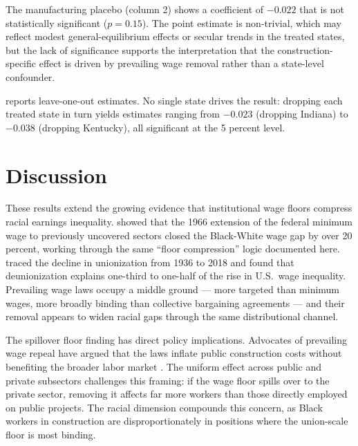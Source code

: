 \documentclass[12pt]{article}
\begin{document}
The manufacturing placebo (column 2) shows a coefficient of $-0.022$ that is not statistically significant ($p = 0.15$). The point estimate is non-trivial, which may reflect modest general-equilibrium effects or secular trends in the treated states, but the lack of significance supports the interpretation that the construction-specific effect is driven by prevailing wage removal rather than a state-level confounder.

 reports leave-one-out estimates. No single state drives the result: dropping each treated state in turn yields estimates ranging from $-0.023$ (dropping Indiana) to $-0.038$ (dropping Kentucky), all significant at the 5 percent level.


\section{Discussion}

These results extend the growing evidence that institutional wage floors compress racial earnings inequality. \citet{derenoncourt2021minimum} showed that the 1966 extension of the federal minimum wage to previously uncovered sectors closed the Black-White wage gap by over 20 percent, working through the same ``floor compression'' logic documented here. \citet{farber2021unions} traced the decline in unionization from 1936 to 2018 and found that deunionization explains one-third to one-half of the rise in U.S.\ wage inequality. Prevailing wage laws occupy a middle ground --- more targeted than minimum wages, more broadly binding than collective bargaining agreements --- and their removal appears to widen racial gaps through the same distributional channel.

The spillover floor finding has direct policy implications. Advocates of prevailing wage repeal have argued that the laws inflate public construction costs without benefiting the broader labor market \citep{fraundorf1984effect, duncan2023prevailing}. The uniform effect across public and private subsectors challenges this framing: if the wage floor spills over to the private sector, removing it affects far more workers than those directly employed on public projects. The racial dimension compounds this concern, as Black workers in construction are disproportionately in positions where the union-scale floor is most binding.
\end{document}
